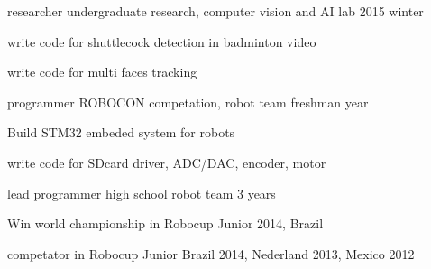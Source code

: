 \begin{cventries}

  \cventry
    {researcher} %
    {undergraduate research, computer vision and AI lab} %
    { } %
    {2015 winter} %
    {
      \begin{cvitems} %
        \item {write code for shuttlecock detection in badminton video}
        \item {write code for multi faces tracking}
      \end{cvitems}
    }


  \cventry
    {programmer} %
    {ROBOCON competation, robot team} %
    { } %
    {freshman year} %
    {
      \begin{cvitems} %
        \item {Build STM32 embeded system for robots}
        \item {write code for SDcard driver, ADC/DAC, encoder, motor}
      \end{cvitems}
    }

  \cventry
    {lead programmer} %
    {high school robot team} %
    { } %
    {3 years} %
    {
      \begin{cvitems} %
        \item {Win world championship in Robocup Junior 2014, Brazil}
        \item {competator in Robocup Junior Brazil 2014, Nederland 2013, Mexico 2012}
      \end{cvitems}
    }

\end{cventries}
